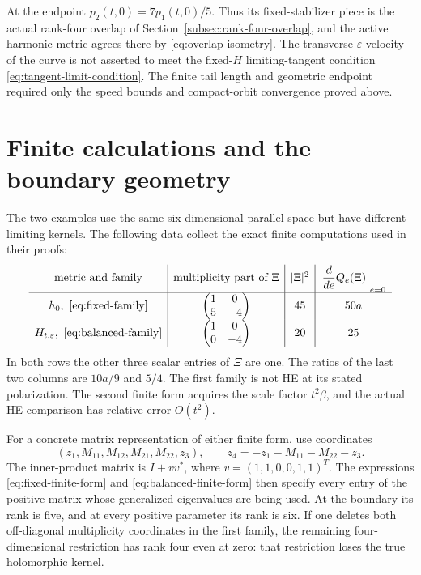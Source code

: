 \documentclass[11pt]{amsart}
\theoremstyle{definition}
\theoremstyle{remark}
\begin{document}
At the endpoint $p_2(t,0)=7p_1(t,0)/5$. Thus its fixed-stabilizer
piece is the actual rank-four overlap of
Section~\ref{subsec:rank-four-overlap}, and the active harmonic metric
agrees there by \eqref{eq:overlap-isometry}. The transverse
$\varepsilon$-velocity of the curve is not asserted to meet the
fixed-$H$ limiting-tangent condition \eqref{eq:tangent-limit-condition}.
The finite tail length and geometric endpoint required only the
speed bounds and compact-orbit convergence proved above.

\section{Finite calculations and the boundary geometry}\label{sec:calculations}

The two examples use the same six-dimensional parallel space but have
different limiting kernels. The following data collect the exact
finite computations used in their proofs:
\[
\begin{array}{c|c|c|c}
\text{metric and family}&\text{multiplicity part of }\Xi&
|\Xi|^2&\left.\dfrac{d}{de}Q_e(\Xi)\right|_{e=0}\\ \hline
h_0,\ \eqref{eq:fixed-family}&
\begin{pmatrix}1&0\\5&-4\end{pmatrix}&45&50a\\[6pt]
H_{t,\varepsilon},\ \eqref{eq:balanced-family}&
\begin{pmatrix}1&0\\0&-4\end{pmatrix}&20&25
\end{array}
\]
In both rows the other three scalar entries of $\Xi$ are one.
The ratios of the last two columns are $10a/9$ and $5/4$.
The first family is not HE at its stated polarization. The second
finite form acquires the scale factor $t^2\beta$, and the actual HE
comparison has relative error $O(t^2)$.

For a concrete matrix representation of either finite form, use
coordinates
\[
 (z_1,M_{11},M_{12},M_{21},M_{22},z_3),\qquad
 z_4=-z_1-M_{11}-M_{22}-z_3.
\]
The inner-product matrix is
$I+vv^*$, where $v=(1,1,0,0,1,1)^T$. The expressions
\eqref{eq:fixed-finite-form} and \eqref{eq:balanced-finite-form}
then specify every entry of the positive matrix whose generalized
eigenvalues are being used. At the boundary its rank is five, and
at every positive parameter its rank is six. If one deletes both
off-diagonal multiplicity coordinates in the first family, the
remaining four-dimensional restriction has rank four even at zero:
that restriction loses the true holomorphic kernel.
\end{document}
